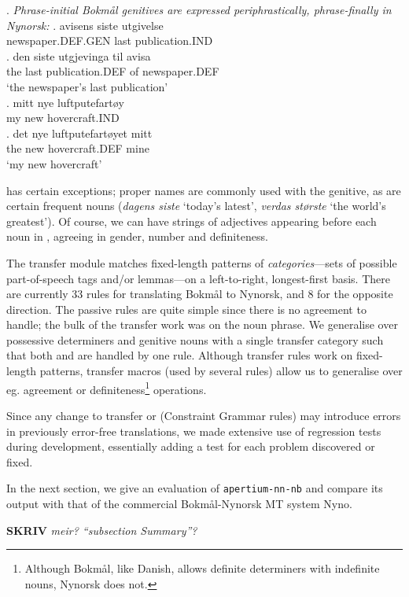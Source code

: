 \documentclass[11pt]{article}
\newcommand{\comment}[1]{\textbf{SKRIV} {\it #1}}
\begin{document}
\ex. \label{posgen} \emph{Phrase-initial Bokmål genitives are expressed
  periphrastically, phrase-finally in Nynorsk:}
\ag. avisens siste utgivelse\\
newspaper.DEF.GEN last publication.IND\\
\bg. den siste utgjevinga til avisa\\
the last publication.DEF of newspaper.DEF\\
`the newspaper's last publication'\\
\cg. mitt nye luftputefartøy\\
my new hovercraft.IND\\
\dg. det nye luftputefartøyet mitt\\
the new hovercraft.DEF mine\\
`my new hovercraft'

\Last has certain exceptions; proper names are commonly used with the
genitive, as are certain frequent nouns (\emph{dagens siste} `today's
latest', \emph{verdas største} `the world's greatest'). Of course, we
can have strings of adjectives appearing before each noun in
\Last[a-d], agreeing in gender, number and definiteness. 

The transfer module matches fixed-length patterns of
\emph{categories}—sets of possible part-of-speech tags and/or
lemmas—on a left-to-right, longest-first basis. There are currently 33
rules for translating Bokmål to Nynorsk, and 8 for the opposite
direction. The passive rules are quite simple since there is no
agreement to handle; the bulk of the transfer work was on the noun
phrase. We generalise over possessive determiners and genitive nouns
with a single transfer category such that both \Last[a-b] and
\Last[c-d] are handled by one rule. Although transfer rules work on
fixed-length patterns, transfer macros (used by several rules) allow
us to generalise over eg. agreement or definiteness\footnote{Although
  Bokmål, like Danish, allows definite determiners with indefinite
  nouns, Nynorsk does not.} operations.

Since any change to transfer or (Constraint Grammar rules) may
introduce errors in previously error-free translations, we made
extensive use of regression tests during development, essentially
adding a test for each problem discovered or fixed.

In the next section, we give an evaluation of {\tt apertium-nn-nb} and
compare its output with that of the commercial Bokmål-Nynorsk MT
system Nyno.

\comment{ meir? ``subsection Summary''? }
\end{document}
